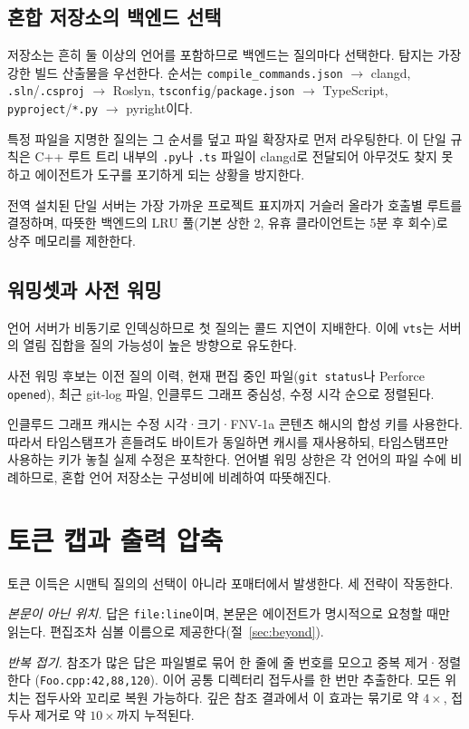 \documentclass[11pt]{article}
\begin{document}
\subsection{혼합 저장소의 백엔드 선택}
저장소는 흔히 둘 이상의 언어를 포함하므로 백엔드는 질의마다 선택한다. 탐지는 가장 강한 빌드
산출물을 우선한다. 순서는 \texttt{compile\_commands.json} $\rightarrow$ clangd,
\texttt{.sln}/\texttt{.csproj} $\rightarrow$ Roslyn,
\texttt{tsconfig}/\texttt{package.json} $\rightarrow$ TypeScript,
\texttt{pyproject}/\texttt{*.py} $\rightarrow$ pyright이다.

특정 파일을 지명한 질의는 그 순서를 덮고 파일 확장자로 먼저 라우팅한다. 이 단일 규칙은 C++
루트 트리 내부의 \texttt{.py}나 \texttt{.ts} 파일이 clangd로 전달되어 아무것도 찾지 못하고
에이전트가 도구를 포기하게 되는 상황을 방지한다.

전역 설치된 단일 서버는 가장 가까운 프로젝트 표지까지 거슬러 올라가 호출별 루트를 결정하며,
따뜻한 백엔드의 LRU 풀(기본 상한 2, 유휴 클라이언트는 5분 후 회수)로 상주 메모리를 제한한다.

\subsection{워밍셋과 사전 워밍}
언어 서버가 비동기로 인덱싱하므로 첫 질의는 콜드 지연이 지배한다. 이에 \texttt{vts}는 서버의
열림 집합을 질의 가능성이 높은 방향으로 유도한다.

사전 워밍 후보는 이전 질의 이력, 현재 편집 중인 파일(\texttt{git status}나 Perforce
\texttt{opened}), 최근 git-log 파일, 인클루드 그래프 중심성, 수정 시각 순으로 정렬된다.

인클루드 그래프 캐시는 수정 시각·크기·FNV-1a 콘텐츠 해시의 합성 키를 사용한다. 따라서
타임스탬프가 흔들려도 바이트가 동일하면 캐시를 재사용하되, 타임스탬프만 사용하는 키가 놓칠
실제 수정은 포착한다. 언어별 워밍 상한은 각 언어의 파일 수에 비례하므로, 혼합 언어 저장소는
구성비에 비례하여 따뜻해진다.

\section{토큰 캡과 출력 압축}
\label{sec:cap}

토큰 이득은 시맨틱 질의의 선택이 아니라 포매터에서 발생한다. 세 전략이 작동한다.

\emph{본문이 아닌 위치.} 답은 \texttt{file:line}이며, 본문은 에이전트가 명시적으로 요청할
때만 읽는다. 편집조차 심볼 이름으로 제공한다(절~\ref{sec:beyond}).

\emph{반복 접기.} 참조가 많은 답은 파일별로 묶어 한 줄에 줄 번호를 모으고 중복 제거·정렬한다
(\texttt{Foo.cpp:42,88,120}). 이어 공통 디렉터리 접두사를 한 번만 추출한다. 모든 위치는
접두사와 꼬리로 복원 가능하다. 깊은 참조 결과에서 이 효과는 묶기로 약 $4\times$, 접두사
제거로 약 $10\times$까지 누적된다.
\end{document}
